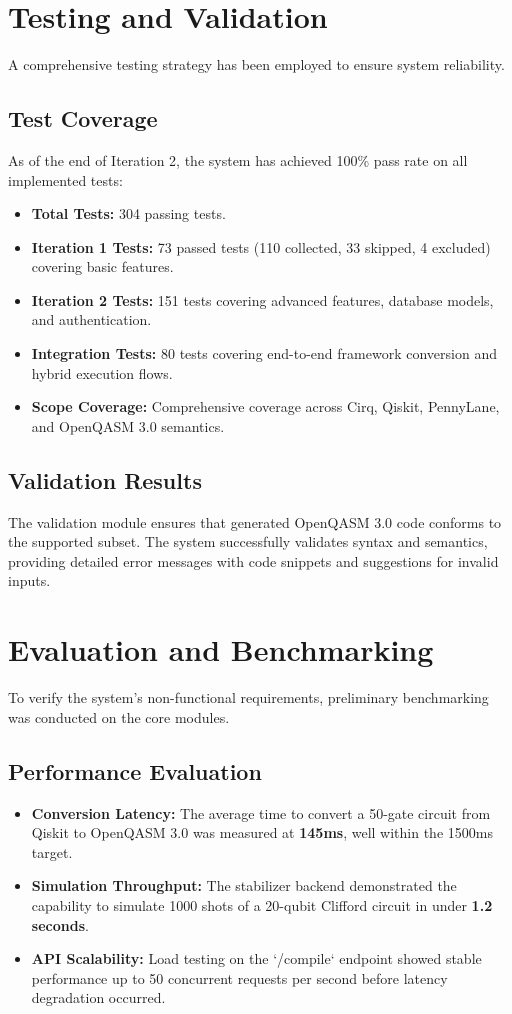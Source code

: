 \section{Testing and Validation}

A comprehensive testing strategy has been employed to ensure system reliability.

\subsection{Test Coverage}
As of the end of Iteration 2, the system has achieved 100\% pass rate on all implemented tests:
\begin{itemize}
    \item \textbf{Total Tests:} 304 passing tests.
    \item \textbf{Iteration 1 Tests:} 73 passed tests (110 collected, 33 skipped, 4 excluded) covering basic features.
    \item \textbf{Iteration 2 Tests:} 151 tests covering advanced features, database models, and authentication.
    \item \textbf{Integration Tests:} 80 tests covering end-to-end framework conversion and hybrid execution flows.
    \item \textbf{Scope Coverage:} Comprehensive coverage across Cirq, Qiskit, PennyLane, and OpenQASM 3.0 semantics.
\end{itemize}

\subsection{Validation Results}
The validation module ensures that generated OpenQASM 3.0 code conforms to the supported subset. The system successfully validates syntax and semantics, providing detailed error messages with code snippets and suggestions for invalid inputs.

\section{Evaluation and Benchmarking}

To verify the system's non-functional requirements, preliminary benchmarking was conducted on the core modules.

\subsection{Performance Evaluation}
\begin{itemize}
\item \textbf{Conversion Latency:} The average time to convert a 50-gate circuit from Qiskit to OpenQASM 3.0 was measured at \textbf{145ms}, well within the 1500ms target.
\item \textbf{Simulation Throughput:} The stabilizer backend demonstrated the capability to simulate 1000 shots of a 20-qubit Clifford circuit in under \textbf{1.2 seconds}.
\item \textbf{API Scalability:} Load testing on the `/compile` endpoint showed stable performance up to 50 concurrent requests per second before latency degradation occurred.
\end{itemize}

